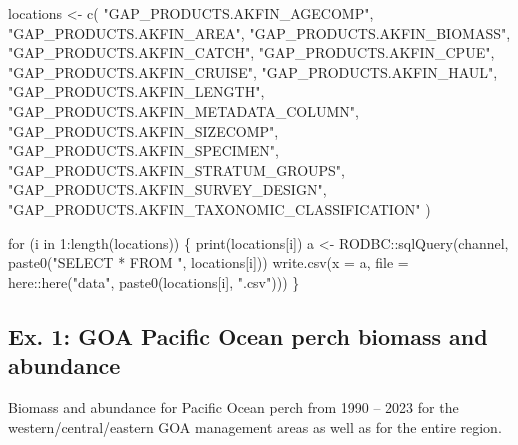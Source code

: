 \documentclass[
  letterpaper,
  oneside,
  open=any]{scrbook}
\newenvironment{Shaded}{\begin{snugshade}}{\end{snugshade}}
\newcommand{\AttributeTok}[1]{\textcolor[rgb]{0.40,0.45,0.13}{#1}}
\newcommand{\ControlFlowTok}[1]{\textcolor[rgb]{0.00,0.23,0.31}{#1}}
\newcommand{\DecValTok}[1]{\textcolor[rgb]{0.68,0.00,0.00}{#1}}
\newcommand{\FunctionTok}[1]{\textcolor[rgb]{0.28,0.35,0.67}{#1}}
\newcommand{\NormalTok}[1]{\textcolor[rgb]{0.00,0.23,0.31}{#1}}
\newcommand{\OtherTok}[1]{\textcolor[rgb]{0.00,0.23,0.31}{#1}}
\newcommand{\SpecialCharTok}[1]{\textcolor[rgb]{0.37,0.37,0.37}{#1}}
\newcommand{\StringTok}[1]{\textcolor[rgb]{0.13,0.47,0.30}{#1}}
\begin{document}
\begin{Shaded}
\begin{Highlighting}[]
\NormalTok{locations }\OtherTok{\textless{}{-}} \FunctionTok{c}\NormalTok{(}
  \StringTok{"GAP\_PRODUCTS.AKFIN\_AGECOMP"}\NormalTok{, }
  \StringTok{"GAP\_PRODUCTS.AKFIN\_AREA"}\NormalTok{, }
  \StringTok{"GAP\_PRODUCTS.AKFIN\_BIOMASS"}\NormalTok{, }
  \StringTok{"GAP\_PRODUCTS.AKFIN\_CATCH"}\NormalTok{, }
  \StringTok{"GAP\_PRODUCTS.AKFIN\_CPUE"}\NormalTok{, }
  \StringTok{"GAP\_PRODUCTS.AKFIN\_CRUISE"}\NormalTok{, }
  \StringTok{"GAP\_PRODUCTS.AKFIN\_HAUL"}\NormalTok{, }
  \StringTok{"GAP\_PRODUCTS.AKFIN\_LENGTH"}\NormalTok{, }
  \StringTok{"GAP\_PRODUCTS.AKFIN\_METADATA\_COLUMN"}\NormalTok{, }
  \StringTok{"GAP\_PRODUCTS.AKFIN\_SIZECOMP"}\NormalTok{, }
  \StringTok{"GAP\_PRODUCTS.AKFIN\_SPECIMEN"}\NormalTok{, }
  \StringTok{"GAP\_PRODUCTS.AKFIN\_STRATUM\_GROUPS"}\NormalTok{, }
  \StringTok{"GAP\_PRODUCTS.AKFIN\_SURVEY\_DESIGN"}\NormalTok{, }
  \StringTok{"GAP\_PRODUCTS.AKFIN\_TAXONOMIC\_CLASSIFICATION"}
\NormalTok{)}

\ControlFlowTok{for}\NormalTok{ (i }\ControlFlowTok{in} \DecValTok{1}\SpecialCharTok{:}\FunctionTok{length}\NormalTok{(locations)) \{}
  \FunctionTok{print}\NormalTok{(locations[i])}
\NormalTok{  a }\OtherTok{\textless{}{-}}\NormalTok{ RODBC}\SpecialCharTok{::}\FunctionTok{sqlQuery}\NormalTok{(channel, }\FunctionTok{paste0}\NormalTok{(}\StringTok{"SELECT * FROM "}\NormalTok{, locations[i]))}
  \FunctionTok{write.csv}\NormalTok{(}\AttributeTok{x =}\NormalTok{ a, }\AttributeTok{file =}\NormalTok{ here}\SpecialCharTok{::}\FunctionTok{here}\NormalTok{(}\StringTok{"data"}\NormalTok{, }\FunctionTok{paste0}\NormalTok{(locations[i], }\StringTok{".csv"}\NormalTok{)))}
\NormalTok{\}}
\end{Highlighting}
\end{Shaded}

\hypertarget{ex.-1-goa-pacific-ocean-perch-biomass-and-abundance}{%
\subsection{Ex. 1: GOA Pacific Ocean perch biomass and
abundance}\label{ex.-1-goa-pacific-ocean-perch-biomass-and-abundance}}

Biomass and abundance for Pacific Ocean perch from 1990 -- 2023 for the
western/central/eastern GOA management areas as well as for the entire
region.
\end{document}
